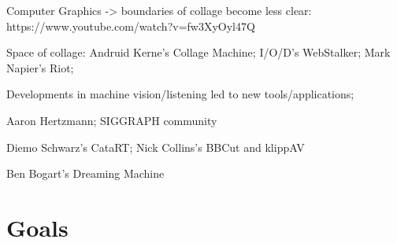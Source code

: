 Computer Graphics -> boundaries of collage become less clear: https://www.youtube.com/watch?v=fw3XyOyl47Q

Space of collage: Andruid Kerne's Collage Machine; I/O/D's WebStalker; Mark Napier's Riot; 

Developments in machine vision/listening led to new tools/applications;

Aaron Hertzmann; SIGGRAPH community

Diemo Schwarz's CataRT; Nick Collins's BBCut and klippAV

Ben Bogart's Dreaming Machine


\section{Goals}

